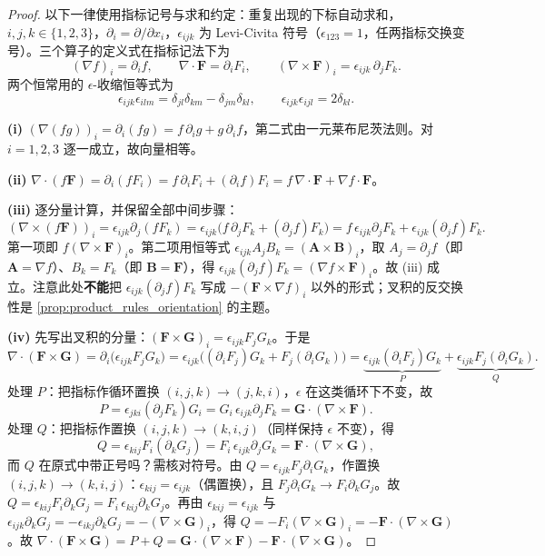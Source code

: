 \begin{proof}
以下一律使用指标记号与求和约定：重复出现的下标自动求和，$i,j,k\in\{1,2,3\}$，$\partial_i = \partial/\partial x_i$，$\epsilon_{ijk}$ 为 Levi-Civita 符号（$\epsilon_{123}=1$，任两指标交换变号）。三个算子的定义式在指标记法下为
\[
(\nabla f)_i = \partial_i f,\qquad
\nabla\cdot\mathbf F = \partial_iF_i,\qquad
(\nabla\times\mathbf F)_i = \epsilon_{ijk}\,\partial_jF_k .
\]
两个恒常用的 $\epsilon$-收缩恒等式为
\[
\epsilon_{ijk}\epsilon_{ilm} = \delta_{jl}\delta_{km}-\delta_{jm}\delta_{kl},
\qquad
\epsilon_{ijk}\epsilon_{ijl} = 2\delta_{kl}.
\]

\textbf{(i)} $(\nabla(fg))_i = \partial_i(fg) = f\,\partial_ig + g\,\partial_if$，第二式由一元莱布尼茨法则。对 $i=1,2,3$ 逐一成立，故向量相等。

\textbf{(ii)} $\nabla\cdot(f\mathbf F) = \partial_i(fF_i) = f\,\partial_iF_i + (\partial_if)F_i = f\,\nabla\cdot\mathbf F + \nabla f\cdot\mathbf F$。

\textbf{(iii)} 逐分量计算，并保留全部中间步骤：
\[
(\nabla\times(f\mathbf F))_i = \epsilon_{ijk}\partial_j(fF_k)
= \epsilon_{ijk}\bigl(f\,\partial_jF_k + (\partial_jf)F_k\bigr)
= f\,\epsilon_{ijk}\partial_jF_k + \epsilon_{ijk}(\partial_jf)F_k .
\]
第一项即 $f(\nabla\times\mathbf F)_i$。第二项用恒等式 $\epsilon_{ijk}A_jB_k = (\mathbf A\times\mathbf B)_i$，取 $A_j=\partial_jf$（即 $\mathbf A=\nabla f$）、$B_k=F_k$（即 $\mathbf B=\mathbf F$），得 $\epsilon_{ijk}(\partial_jf)F_k = (\nabla f\times\mathbf F)_i$。故 (iii) 成立。注意此处\textbf{不能}把 $\epsilon_{ijk}(\partial_jf)F_k$ 写成 $-(\mathbf F\times\nabla f)_i$ 以外的形式；叉积的反交换性是 \cref{prop:product_rules_orientation} 的主题。

\textbf{(iv)} 先写出叉积的分量：$(\mathbf F\times\mathbf G)_i = \epsilon_{ijk}F_jG_k$。于是
\[
\nabla\cdot(\mathbf F\times\mathbf G) = \partial_i\bigl(\epsilon_{ijk}F_jG_k\bigr)
= \epsilon_{ijk}\bigl((\partial_iF_j)G_k + F_j(\partial_iG_k)\bigr)
= \underbrace{\epsilon_{ijk}(\partial_iF_j)G_k}_{P} + \underbrace{\epsilon_{ijk}F_j(\partial_iG_k)}_{Q}.
\]
处理 $P$：把指标作循环置换 $(i,j,k)\to(j,k,i)$，$\epsilon$ 在这类循环下不变，故
\[
P = \epsilon_{jki}(\partial_jF_k)G_i = G_i\,\epsilon_{ijk}\partial_jF_k = \mathbf G\cdot(\nabla\times\mathbf F).
\]
处理 $Q$：把指标作置换 $(i,j,k)\to(k,i,j)$（同样保持 $\epsilon$ 不变），得
\[
Q = \epsilon_{kij}F_i(\partial_kG_j) = F_i\,\epsilon_{ijk}\partial_jG_k = \mathbf F\cdot(\nabla\times\mathbf G),
\]
而 $Q$ 在原式中带正号吗？需核对符号。由 $Q=\epsilon_{ijk}F_j\partial_iG_k$，作置换 $(i,j,k)\to(k,i,j)$：$\epsilon_{kij}=\epsilon_{ijk}$（偶置换），且 $F_j\partial_iG_k \to F_i\partial_kG_j$。故 $Q=\epsilon_{kij}F_i\partial_kG_j = F_i\,\epsilon_{kij}\partial_kG_j$。再由 $\epsilon_{kij}=\epsilon_{ijk}$ 与 $\epsilon_{ijk}\partial_kG_j = -\epsilon_{ikj}\partial_kG_j = -(\nabla\times\mathbf G)_i$，得 $Q = -F_i(\nabla\times\mathbf G)_i = -\mathbf F\cdot(\nabla\times\mathbf G)$。故 $\nabla\cdot(\mathbf F\times\mathbf G) = P+Q = \mathbf G\cdot(\nabla\times\mathbf F)-\mathbf F\cdot(\nabla\times\mathbf G)$。


\end{proof}

